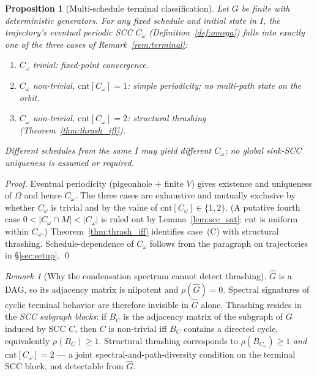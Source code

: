 \documentclass[11pt,letterpaper]{article}
\theoremstyle{plain}
\newtheorem{proposition}[theorem]{Proposition}
\theoremstyle{definition}
\theoremstyle{remark}
\newtheorem{remark}[theorem]{Remark}
\newcommand{\Ghat}{\hat{G}}
\begin{document}
\begin{proposition}[Multi-schedule terminal classification]
  \label{prop:terminal}
  Let $G$ be finite with deterministic generators.
  For any fixed schedule and initial state in $I$, the trajectory's eventual
  periodic SCC $C_\omega$ (Definition~\ref{def:omega}) falls into exactly one
  of the three cases of Remark~\ref{rem:terminal}:
  \begin{enumerate}
    \item[(A)] $C_\omega$ trivial: fixed-point convergence.
    \item[(B)] $C_\omega$ non-trivial, $\mathrm{cnt}[C_\omega] = 1$:
      simple periodicity; no multi-path state on the orbit.
    \item[(C)] $C_\omega$ non-trivial, $\mathrm{cnt}[C_\omega] = 2$:
      structural thrashing (Theorem~\ref{thm:thrash_iff}).
  \end{enumerate}
  Different schedules from the same $I$ may yield different $C_\omega$;
  no global sink-SCC uniqueness is assumed or required.
\end{proposition}
\begin{proof}
  Eventual periodicity (pigeonhole + finite $V$) gives existence and
  uniqueness of $\Omega$ and hence $C_\omega$.
  The three cases are exhaustive and mutually exclusive by whether $C_\omega$
  is trivial and by the value of $\mathrm{cnt}[C_\omega] \in \{1,2\}$.
  (A putative fourth case $0 < |C_\omega \cap M| < |C_\omega|$ is ruled out
  by Lemma~\ref{lem:scc_sat}: $\mathrm{cnt}$ is uniform within $C_\omega$.)
  Theorem~\ref{thm:thrash_iff} identifies case~(C) with structural thrashing.
  Schedule-dependence of $C_\omega$ follows from the paragraph on
  trajectories in \S\ref{sec:setup}. \qed
\end{proof}

\begin{remark}[Why the condensation spectrum cannot detect thrashing]
  \label{rem:spectral}
  $\Ghat$ is a DAG, so its adjacency matrix is nilpotent and
  $\rho(\Ghat) = 0$.
  Spectral signatures of cyclic terminal behavior are therefore invisible
  in $\Ghat$ alone.
  Thrashing resides in the \emph{SCC subgraph blocks}: if $B_{C}$ is the
  adjacency matrix of the subgraph of $G$ induced by SCC $C$, then $C$
  is non-trivial iff $B_{C}$ contains a directed cycle, equivalently
  $\rho(B_{C}) \geq 1$.
  Structural thrashing corresponds to $\rho(B_{C_\omega}) \geq 1$
  \emph{and} $\mathrm{cnt}[C_\omega] = 2$ --- a joint spectral-and-path-diversity
  condition on the terminal SCC block, not detectable from $\Ghat$.
\end{remark}
\end{document}
